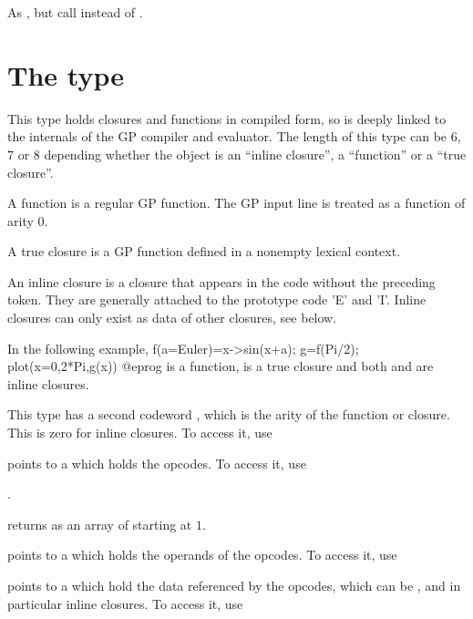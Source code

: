  As , but call
 instead of .

\section{The type }
This type holds closures and functions in compiled form, so is deeply
linked to the internals of the GP compiler and evaluator.
The length of this type can be $6$, $7$ or $8$ depending whether the
object is an ``inline closure'', a ``function'' or a ``true closure''.

A function is a regular GP function. The GP input line is treated as a
function of arity $0$.

A true closure is a GP function defined in a nonempty lexical context.

An inline closure is a closure that appears in the code without
the preceding \kbd{->} token. They are generally attached to the prototype
code 'E' and 'I'. Inline closures can only exist as data of other closures,
see below.

In the following example,
\bprog
f(a=Euler)=x->sin(x+a);
g=f(Pi/2);
plot(x=0,2*Pi,g(x))
@eprog\noindent
{} is a function,  is a true closure and both  and
 are inline closures.

This type has a second codeword , which is the arity of the
function or closure. This is zero for inline closures. To access it, use


\item {} points to a  which holds the opcodes. To access it, use

.

 returns as an array of 
starting at $1$.

\item {} points to a  which holds the operands of the opcodes.
To access it, use


\item {} points to a  which hold the data referenced by the
 opcodes, which can be , and in particular
inline closures. To access it, use

